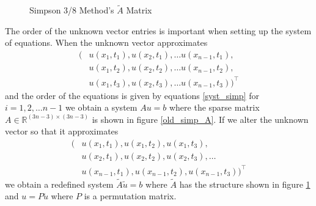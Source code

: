 \documentclass[00main.tex]{subfiles}
\begin{document}


\begin{figure}
\centering
\resizebox{0.5\textwidth}{!}{
}
\caption{Simpson 3/8 Method's $\tilde{A}$ Matrix}
\label{new_simp_A}
\end{figure}%

The order of the unknown vector entries is important when setting up the system of equations. When the unknown vector approximates \begin{align*}
(&u(x_1,t_1), u(x_2,t_1),\hdots u(x_{n-1},t_1), \\
&u(x_1,t_2), u(x_2,t_2),\hdots u(x_{n-1},t_2), \\
&u(x_1,t_3), u(x_2,t_3),\hdots u(x_{n-1},t_3))^\top
\end{align*} and the order of the equations is given by equations \eqref{syst_simp} for $i=1,2,\hdots n-1$ we obtain a system $Au=b$ where the sparse matrix $A\in \mathbb{R}^{(3n-3)\times(3n-3)}$ is shown in figure \ref{old_simp_A}. If we alter the unknown vector so that it approximates \begin{align*}
(&u(x_1,t_1), u(x_1,t_2), u(x_1,t_3), \\
&u(x_2,t_1), u(x_2,t_2), u(x_2,t_3), \hdots \\
&u(x_{n-1},t_1), u(x_{n-1},t_2), u(x_{n-1},t_3))^\top
\end{align*} we obtain a redefined system $\tilde{A} \tilde{u} = b$ where $\tilde{A}$ has the structure shown in figure \ref{new_simp_A} and $u=P\tilde{u}$ where $P$ is a permutation matrix.
\end{document}
